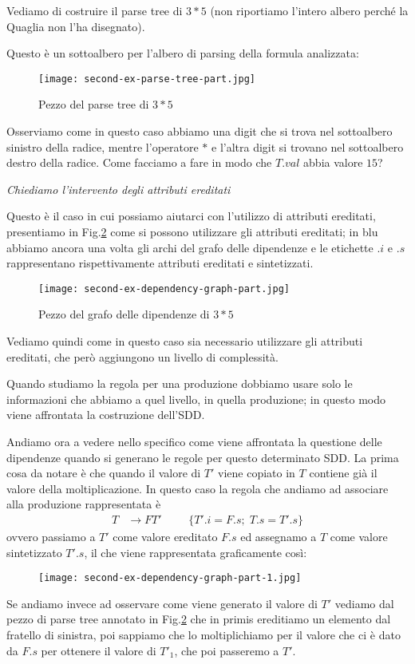 \documentclass[class=book, crop=false, oneside, 12pt]{standalone}
\begin{document}
Vediamo di costruire il parse tree di \(3*5\) (non riportiamo l'intero albero perché la Quaglia non l'ha disegnato).

Questo è un sottoalbero per l'albero di parsing della formula analizzata:
\begin{figure}[H]
    \centering
    \texttt{[image: second-ex-parse-tree-part.jpg]}
    \caption{Pezzo del parse tree di \(3*5\)}
    \label{fig:second-ex-parse-tree-part}
\end{figure}
Osserviamo come in questo caso abbiamo una digit che si trova nel sottoalbero sinistro della radice, mentre l'operatore \(*\) e l'altra digit si trovano nel sottoalbero destro della radice.
Come facciamo a fare in modo che \(T.val\) abbia valore \(15\)?

\noindent \emph{Chiediamo l'intervento degli attributi ereditati}

\noindent Questo è il caso in cui possiamo aiutarci con l'utilizzo di attributi ereditati, presentiamo in Fig.\ref{fig:second-ex-dependency-graph-part} come si possono utilizzare gli attributi ereditati; in blu abbiamo ancora una volta gli archi del grafo delle dipendenze e le etichette \(.i\) e \(.s\) rappresentano rispettivamente attributi ereditati e sintetizzati.
\begin{figure}[H]
    \centering
    \texttt{[image: second-ex-dependency-graph-part.jpg]}
    \caption{Pezzo del grafo delle dipendenze di \(3*5\)}
    \label{fig:second-ex-dependency-graph-part}
\end{figure}
Vediamo quindi come in questo caso sia necessario utilizzare gli attributi ereditati, che però aggiungono un livello di complessità.

Quando studiamo la regola per una produzione dobbiamo usare solo le informazioni che abbiamo a quel livello, in quella produzione; in questo modo viene affrontata la costruzione dell'SDD.

Andiamo ora a vedere nello specifico come viene affrontata la questione delle dipendenze quando si generano le regole per questo determinato SDD.
La prima cosa da notare è che quando il valore di \(T'\) viene copiato in \(T\) contiene già il valore della moltiplicazione.
In questo caso la regola che andiamo ad associare alla produzione rappresentata è
\begin{align*}
    T &\to FT' & & &\{T'.i = F.s; \; T.s = T'.s\}
\end{align*}
ovvero passiamo a \(T'\) come valore ereditato \(F.s\) ed assegnamo a \(T\) come valore sintetizzato \(T'.s\), il che viene rappresentata graficamente così:
\begin{figure}[H]
    \centering
    \texttt{[image: second-ex-dependency-graph-part-1.jpg]}
\end{figure}
Se andiamo invece ad osservare come viene generato il valore di \(T'\) vediamo dal pezzo di parse tree annotato in Fig.\ref{fig:second-ex-dependency-graph-part} che in primis ereditiamo un elemento dal fratello di sinistra, poi sappiamo che lo moltiplichiamo per il valore che ci è dato da \(F.s\) per ottenere il valore di \(T'_1\), che poi passeremo a \(T'\).
\end{document}
